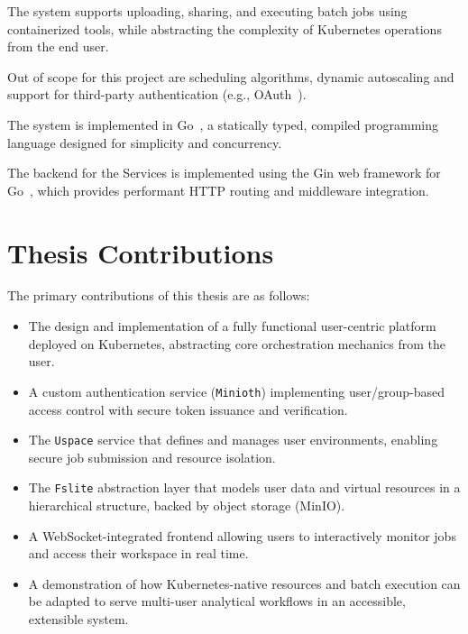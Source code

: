 The system supports uploading, sharing, and executing batch jobs using containerized tools, while abstracting the complexity of 
Kubernetes operations from the end user.

Out of scope for this project are scheduling algorithms, dynamic autoscaling and support for third-party 
authentication (e.g., OAuth~\cite{oauth2-rfc6749}).

The system is implemented in Go~\cite{golang}, a statically typed, compiled programming language designed for simplicity and concurrency.

The backend for the Services is implemented using the Gin web framework for Go~\cite{gingonic}, which provides performant HTTP routing and middleware integration.

\section{Thesis Contributions}
\hspace{2mm}The primary contributions of this thesis are as follows:
\begin{itemize}
    \item The design and implementation of a fully functional user-centric platform deployed on Kubernetes, 
    abstracting core orchestration mechanics from the user.
    \item A custom authentication service (\texttt{Minioth}) implementing user/group-based access control with secure 
    token issuance and verification.
    \item The \texttt{Uspace} service that defines and manages user environments, enabling secure job submission and resource 
    isolation.
    \item The \texttt{Fslite} abstraction layer that models user data and virtual resources in a hierarchical structure, 
    backed by object storage (MinIO).
    \item A WebSocket-integrated frontend allowing users to interactively monitor jobs and access 
    their workspace in real time.
    \item A demonstration of how Kubernetes-native resources and batch execution can be adapted to serve multi-user analytical 
    workflows in an accessible, extensible system.
\end{itemize}



\newpage
